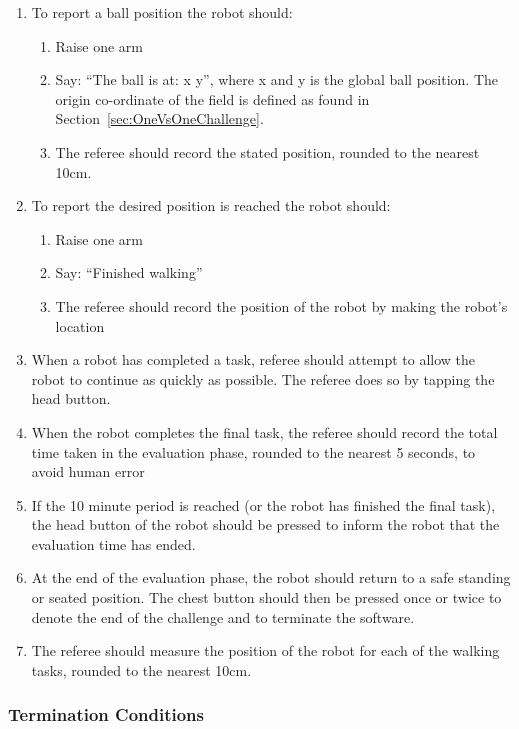 \begin{enumerate}
    \item To report a ball position the robot should:
    \begin{enumerate}
        \item Raise one arm
        \item Say: ``The ball is at: x y'', where x and y is the global ball position. The origin co-ordinate of the field is defined as found in Section~\ref{sec:OneVsOneChallenge}.
        \item The referee should record the stated position, rounded to the nearest 10cm.
    \end{enumerate}
    \item To report the desired position is reached the robot should:
    \begin{enumerate}
        \item Raise one arm
        \item Say: ``Finished walking''
        \item The referee should record the position of the robot by making the robot's location
    \end{enumerate}
    \item When a robot has completed a task, referee should attempt to allow the robot to continue as quickly as possible. The referee does so by tapping the head button.
    \item When the robot completes the final task, the referee should record the total time taken in the evaluation phase, rounded to the nearest 5 seconds, to avoid human error 
    \item If the 10 minute period is reached (or the robot has finished the final task), the head button of the robot should be pressed to inform the robot that the evaluation time has ended.
    \item At the end of the evaluation phase, the robot should return to a safe standing or seated position. The chest button should then be pressed once or twice to denote the end of the challenge and to terminate the software.
    \item The referee should measure the position of the robot for each of the walking tasks, rounded to the nearest 10cm.
\end{enumerate} 

\subsubsection{Termination Conditions}

